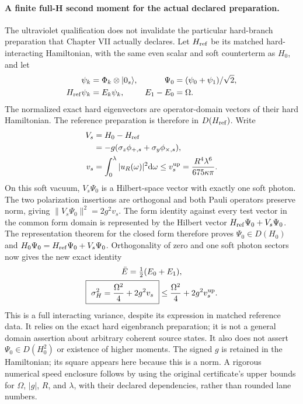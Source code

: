 \paragraph{A finite full-H second moment for the actual declared preparation.}
The ultraviolet qualification does not invalidate the particular hard-branch
preparation that Chapter VII actually declares. Let $H_{\rm ref}$ be its
matched hard-interacting Hamiltonian, with the same even scalar and soft
counterterm as $H_0$, and let
\begin{equation}
\begin{aligned}
 \psi_k&=\Phi_k\otimes|0_s\rangle,
 &\Psi_0&=(\psi_0+\psi_1)/\sqrt2,\\
 H_{\rm ref}\psi_k&=E_k\psi_k,
 &E_1-E_0&=\Omega.
\end{aligned}
\end{equation}
The normalized exact hard eigenvectors are operator-domain vectors of their
hard Hamiltonian. The reference preparation is therefore in
$D(H_{\rm ref})$. Write
\begin{equation}
\begin{aligned}
 V_s&=H_0-H_{\rm ref}\\
    &=-g(\sigma_z\phi_{+,s}+\sigma_y\phi_{\times,s}),\\
 v_s&=\int_0^\lambda|u_R(\omega)|^2\mathrm d\omega
 \leq v_s^{\rm up}=\frac{R^4\lambda^6}{675\kappa\pi}.
\end{aligned}
\end{equation}
On this soft vacuum, $V_s\Psi_0$ is a Hilbert-space vector with exactly one
soft photon. The two polarization insertions are orthogonal and both Pauli
operators preserve norm, giving $\|V_s\Psi_0\|^2=2g^2v_s$.
The form identity against every test vector in the common form domain is
represented by the Hilbert vector $H_{\rm ref}\Psi_0+V_s\Psi_0$.
The representation theorem for the closed form therefore proves
$\Psi_0\in D(H_0)$ and $H_0\Psi_0=H_{\rm ref}\Psi_0+V_s\Psi_0$.
Orthogonality of zero and one soft photon sectors now gives the new exact
identity
\begin{equation}
\begin{gathered}
\bar E=\tfrac12(E_0+E_1),\\
 \boxed{\ \sigma_H^2=\frac{\Omega^2}{4}+2g^2v_s\ }
 \leq\frac{\Omega^2}{4}+2g^2v_s^{\rm up}.
\end{gathered}
\label{eq:ch6-prepared-full-variance}
\end{equation}
This is a full interacting variance, despite its expression in matched
reference data. It relies on the exact hard eigenbranch preparation; it is
not a general domain assertion about arbitrary coherent source states.
It also does not assert $\Psi_0\in D(H_0^2)$ or existence of higher moments.
The signed $g$ is retained in the Hamiltonian; its square appears here because
this is a norm. A rigorous numerical speed enclosure follows by using the
original certificate's upper bounds for $\Omega$, $|g|$, $R$, and $\lambda$,
with their declared dependencies, rather than rounded lane numbers.

